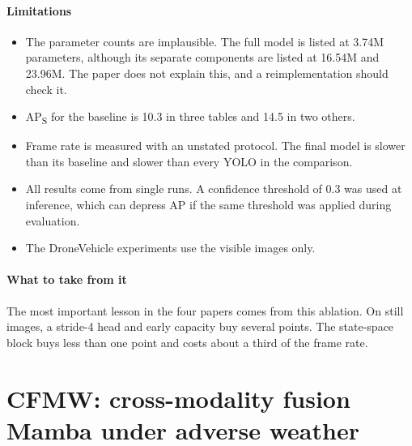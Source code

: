 \paragraph{Limitations}
\begin{itemize}
  \item The parameter counts are implausible. The full model is listed at
        3.74M parameters, although its separate components are listed at
        16.54M and 23.96M. The paper does not explain this, and a
        reimplementation should check it.
  \item AP\textsubscript{S} for the baseline is 10.3 in three tables and
        14.5 in two others.
  \item Frame rate is measured with an unstated protocol. The final model
        is slower than its baseline and slower than every YOLO in the
        comparison.
  \item All results come from single runs. A confidence threshold of 0.3 was
        used at inference, which can depress AP if the same threshold was
        applied during evaluation.
  \item The DroneVehicle experiments use the visible images only.
\end{itemize}

\paragraph{What to take from it}
The most important lesson in the four papers comes from this ablation. On
still images, a stride-4 head and early capacity buy several points. The
state-space block buys less than one point and costs about a third of the
frame rate.

\section{CFMW: cross-modality fusion Mamba under adverse weather}
\label{sec:src-cfmw}

